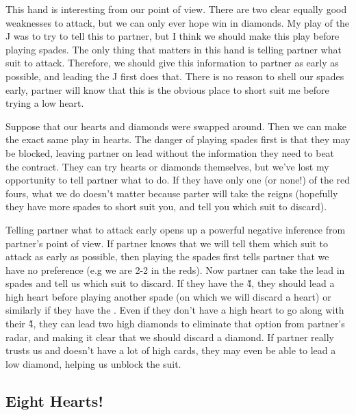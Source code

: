 \documentclass[a4paper]{JoshCards}
\begin{document}
This hand is interesting from our point of view. There are two clear equally good weaknesses to attack, but we can only ever hope win in diamonds. My play of the \D J was to try to tell this to partner, but I think we should make this play before playing spades. The only thing that matters in this hand is telling partner what suit to attack. Therefore, we should give this information to partner as early as possible, and leading the \D J first does that. There is no reason to shell our spades early, partner will know that this is the obvious place to short suit me before trying a low heart.

Suppose that our hearts and diamonds were swapped around. Then we can make the exact same play in hearts. The danger of playing spades first is that they may be blocked, leaving partner on lead without the information they need to beat the contract. They can try hearts or diamonds themselves, but we've lost my opportunity to tell partner what to do. If they have only one (or none!) of the red fours, what we do doesn't matter because parter will take the reigns (hopefully they have more spades to short suit you, and tell you which suit to discard).

Telling partner what to attack early opens up a powerful negative inference from partner's point of view. If partner knows that we will tell them which suit to attack as early as possible, then playing the spades first tells partner that we have no preference (e.g we are 2-2 in the reds). Now partner can take the lead in spades and tell us which suit to discard. If they have the \H 4, they should lead a high heart before playing another spade (on which we will discard a heart) or similarly if they have the . Even if they don't have a high heart to go along with their \H 4, they can lead two high diamonds to eliminate that option from partner's radar, and making it clear that we should discard a diamond. If partner really trusts us and doesn't have a lot of high cards, they may even be able to lead a low diamond, helping us unblock the suit.


\subsection*{Eight Hearts!}

\gamefont{\larger}
\northhand{}{}{}{}
\westhand{}{}{}{}
\easthand{}{}{}{}
\leftupper{}%
{}{}
\leftupper{}{}{}
\rightupper{}{}{}
\rightlower{}{}{}
\showAll*
\end{document}
